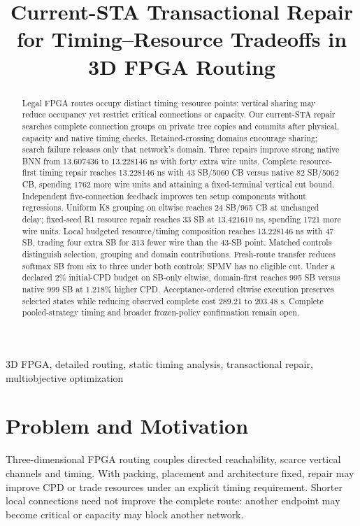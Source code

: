 \documentclass[conference,10pt]{IEEEtran}
\title{Current-STA Transactional Repair for Timing--Resource Tradeoffs in 3D FPGA Routing}
\author{\IEEEauthorblockN{Anonymous development manuscript}}
\begin{document}
\maketitle
\begin{abstract}
Legal FPGA routes occupy distinct timing--resource points: vertical sharing may reduce occupancy yet restrict critical connections or capacity. Our current-STA repair searches complete connection groups on private tree copies and commits after physical, capacity and native timing checks. Retained-crossing domains encourage sharing; search failure releases only that network's domain. Three repairs improve strong native BNN from 13.607436 to 13.228146 ns with forty extra wire units. Complete resource-first timing repair reaches 13.228146 ns with 43 SB/5060 CB versus native 82 SB/5062 CB, spending 1762 more wire units and attaining a fixed-terminal vertical cut bound. Independent five-connection feedback improves ten setup components without regressions. Uniform K8 grouping on eltwise reaches 24 SB/965 CB at unchanged delay; fixed-seed R1 resource repair reaches 33 SB at 13.421610 ns, spending 1721 more wire units. Local budgeted resource/timing composition reaches 13.228146 ns with 47 SB, trading four extra SB for 313 fewer wire than the 43-SB point. Matched controls distinguish selection, grouping and domain contributions. Fresh-route transfer reduces softmax SB from six to three under both controls; SPMV has no eligible cut. Under a declared 2\% initial-CPD budget on SB-only eltwise, domain-first reaches 995 SB versus native 999 SB at 1.218\% higher CPD. Acceptance-ordered eltwise execution preserves selected states while reducing observed complete cost 289.21 to 203.48 s. Complete pooled-strategy timing and broader frozen-policy confirmation remain open.
\end{abstract}
\begin{IEEEkeywords}
3D FPGA, detailed routing, static timing analysis, transactional repair, multiobjective optimization
\end{IEEEkeywords}

\section{Problem and Motivation}
Three-dimensional FPGA routing couples directed reachability, scarce vertical channels and timing. With packing, placement and architecture fixed, repair may improve CPD or trade resources under an explicit timing requirement. Shorter local connections need not improve the complete route: another endpoint may become critical or capacity may block another network.
\end{document}
